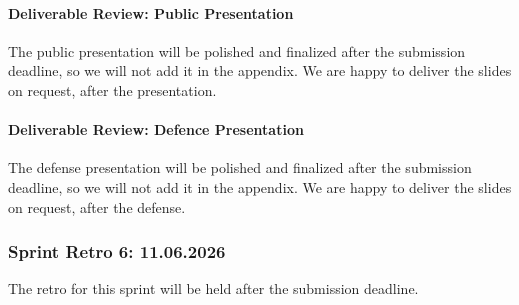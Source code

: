 \paragraph{Deliverable Review: Public Presentation}\label{par:deliverable-review-public-presentation}

The public presentation will be polished and finalized after the submission deadline,
so we will not add it in the appendix.
We are happy to deliver the slides on request, after the presentation.

\paragraph{Deliverable Review: Defence Presentation}\label{par:deliverable-review-defence-presentation}

The defense presentation will be polished and finalized after the submission deadline,
so we will not add it in the appendix.
We are happy to deliver the slides on request, after the defense.

\subsubsection{Sprint Retro 6: 11.06.2026}\label{subsubsec:sprint-retro-6}

The retro for this sprint will be held after the submission deadline.
